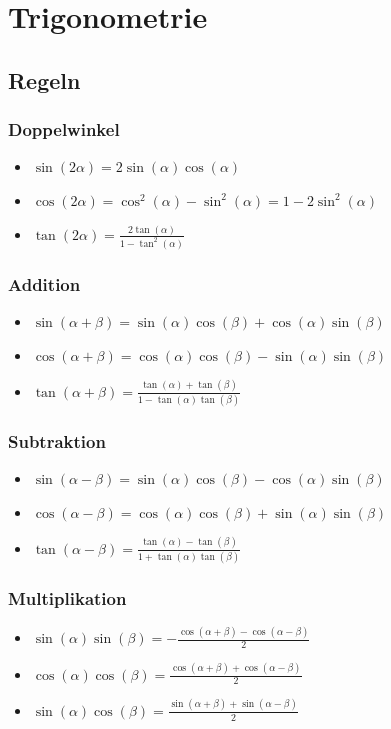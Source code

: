 \documentclass[a4paper,10pt]{article}
\begin{document}
\small
\section{Trigonometrie}

\subsection{Regeln}

\subsubsection{Doppelwinkel}
\begin{itemize}
 \item $\sin(2\alpha) = 2 \sin(\alpha) \cos(\alpha)$
 \item $\cos(2\alpha) = \cos^2(\alpha) - \sin^2(\alpha) = 1 - 2 \sin^2(\alpha)$
 \item $\tan(2\alpha) = \frac{2\tan(\alpha)}{1 - \tan^2(\alpha)}$
\end{itemize}

\subsubsection{Addition}
\begin{itemize}
 \item $\sin(\alpha + \beta) = \sin(\alpha) \cos(\beta) + \cos(\alpha) \sin(\beta)$
 \item $\cos(\alpha + \beta) = \cos(\alpha) \cos(\beta) - \sin(\alpha) \sin(\beta)$
 \item $\tan(\alpha + \beta) = \frac{\tan(\alpha) + \tan(\beta)}{1 - \tan(\alpha) \tan(\beta)}$
\end{itemize}

\subsubsection{Subtraktion}
\begin{itemize}
 \item $\sin(\alpha - \beta) = \sin(\alpha) \cos(\beta) - \cos(\alpha)\sin(\beta)$
 \item $\cos(\alpha - \beta) = \cos(\alpha) \cos(\beta) + \sin(\alpha)\sin(\beta)$
 \item $\tan(\alpha - \beta) = \frac{\tan(\alpha) - \tan(\beta)}{1+\tan(\alpha) \tan(\beta)}$
\end{itemize}

\subsubsection{Multiplikation}
\begin{itemize}
 \item $\sin(\alpha) \sin(\beta) = -\frac{\cos(\alpha + \beta) - \cos(\alpha - \beta)}{2}$
 \item $\cos(\alpha) \cos(\beta) =  \frac{\cos(\alpha + \beta) + \cos(\alpha - \beta)}{2}$
 \item $\sin(\alpha) \cos(\beta) =  \frac{\sin(\alpha + \beta) + \sin(\alpha - \beta)}{2}$
\end{itemize}
\end{document}
